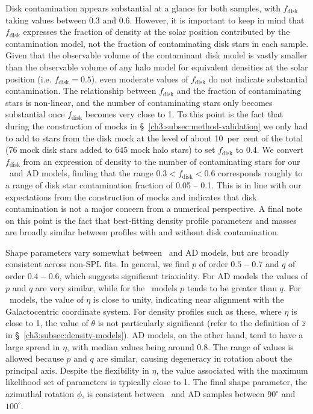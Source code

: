Disk contamination appears substantial at a glance for both samples, with $f_\mathrm{disk}$ taking values between 0.3 and 0.6. However, it is important to keep in mind that $f_\mathrm{disk}$ expresses the fraction of density at the solar position contributed by the contamination model, not the fraction of contaminating disk stars in each sample. Given that the observable volume of the contaminant disk model is vastly smaller than the observable volume of any halo model for equivalent densities at the solar position (i.e. $f_\mathrm{disk}=0.5$), even moderate values of $f_\mathrm{disk}$ do not indicate substantial contamination. The relationship between $f_\mathrm{disk}$ and the fraction of contaminating stars is non-linear, and the number of contaminating stars only becomes substantial once $f_\mathrm{disk}$ becomes very close to 1. To this point is the fact that during the construction of mocks in \S~\ref{ch3:subsec:method-validation} we only had to add to stars from the disk mock at the level of about 10~per~cent of the total (76 mock disk stars added to 645 mock halo stars) to set $f_\mathrm{disk}$ to 0.4. We convert $f_\mathrm{disk}$ from an expression of density to the number of contaminating stars for our \eLz\ and AD models, finding that the range $0.3 < f_\mathrm{disk} < 0.6$ corresponds roughly to a range of disk star contamination fraction of 0.05 -- 0.1. This is in line with our expectations from the construction of mocks and indicates that disk contamination is not a major concern from a numerical perspective. A final note on this point is the fact that best-fitting density profile parameters and masses are broadly similar between profiles with and without disk contamination.

Shape parameters vary somewhat between \eLz\ and AD models, but are broadly consistent across non-SPL fits. In general, we find $p$ of order $0.5-0.7$ and $q$ of order $0.4-0.6$, which suggests significant triaxiality. For AD models the values of $p$ and $q$ are very similar, while for the \eLz\ models $p$ tends to be greater than $q$. For \eLz\ models, the value of $\eta$ is close to unity, indicating near alignment with the Galactocentric coordinate system. For density profiles such as these, where $\eta$ is close to 1, the value of $\theta$ is not particularly significant (refer to the definition of $\hat{z}$ in \S~\ref{ch3:subsec:density-models}). AD models, on the other hand, tend to have a large spread in $\eta$, with median values being around 0.8. The range of values is allowed because $p$ and $q$ are similar, causing degeneracy in rotation about the principal axis. Despite the flexibility in $\eta$, the value associated with the maximum likelihood set of parameters is typically close to 1. The final shape parameter, the azimuthal rotation $\phi$, is consistent between \eLz\ and AD samples between $90^{\circ}$ and $100^{\circ}$. 

